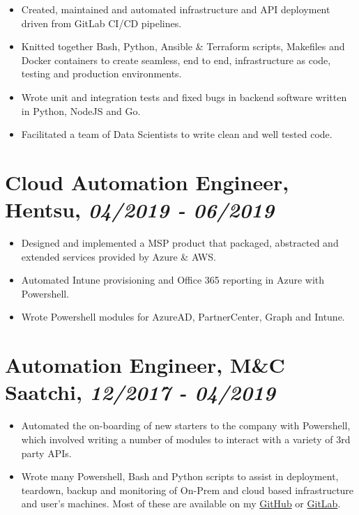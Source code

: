 \documentclass[letterpaper]{article}
\begin{document}
\begin{itemize}
\item Created, maintained and automated infrastructure and API deployment driven
from GitLab CI/CD pipelines.

\item Knitted together Bash, Python, Ansible \& Terraform scripts, Makefiles and
Docker containers to create seamless, end to end, infrastructure as code,
testing and production environments.

\item Wrote unit and integration tests and fixed bugs in backend software written
in Python, NodeJS and Go.

\item Facilitated a team of Data Scientists to write clean and well tested code.
\end{itemize}

\section{Cloud Automation Engineer, Hentsu, \emph{04/2019 - 06/2019}}
\label{sec:org11d1515}

\begin{itemize}
\item Designed and implemented a MSP product that packaged, abstracted and extended
services provided by Azure \& AWS.

\item Automated Intune provisioning and Office 365 reporting in Azure with
Powershell.

\item Wrote Powershell modules for AzureAD, PartnerCenter, Graph and Intune.
\end{itemize}

\section{Automation Engineer, M\&C Saatchi, \emph{12/2017 - 04/2019}}
\label{sec:org8f8953d}

\begin{itemize}
\item Automated the on-boarding of new starters to the company with Powershell,
which involved writing a number of modules to interact with a variety of 3rd
party APIs.
\item Wrote many Powershell, Bash and Python scripts to assist in deployment,
teardown, backup and monitoring of On-Prem and cloud based infrastructure and
user's machines. Most of these are available on my \href{https://github.com/tslight}{GitHub} or \href{https://gitlab.com/tspub}{GitLab}.
\end{itemize}
\end{document}
